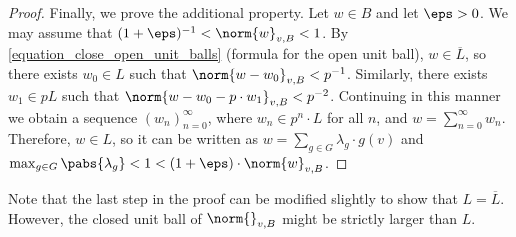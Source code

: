 \begin{proof}
    Finally, we prove the additional property.
    Let $w\in B$ and let $\eps>0$.
    We may assume that $(1+\eps)^{-1}<\norm{w}_{v,B}<1$.
    By \ref{equation_close_open_unit_balls} (formula for the open unit ball), $w\in\overline{L}$, so there exists $w_0\in L$ such that $\norm{w-w_0}_{v,B}<p^{-1}$.
    Similarly, there exists $w_1\in pL$ such that $\norm{w-w_0-p\cdot w_1}_{v,B}<p^{-2}$.
    Continuing in this manner we obtain a sequence $(w_n)_{n=0}^\infty$, where $w_n\in p^n\cdot L$ for all $n$, and $w=\sum_{n=0}^\infty w_n$.
    Therefore, $w\in L$, so it can be written as $w=\sum_{g\in G}\lambda_g\cdot g(v)$ and $\max_{g\in G}\pabs{\lambda_g}<1<(1+\eps)\cdot \norm{w}_{v,B}$.
    \end{proof} 

    \begin{remark}
    Note that the last step in the proof can be modified slightly to show that $L=\overline{L}$.
    However, the closed unit ball of $\norm{}_{v,B}$ might be strictly larger than $L$.
    \end{remark} 


